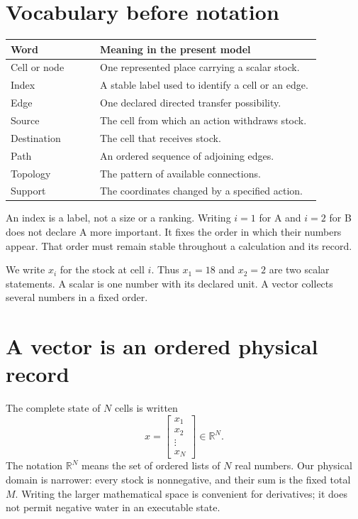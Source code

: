 \section{Vocabulary before notation}
\begin{center}
\begin{tabular}{P{0.25\linewidth}P{0.62\linewidth}}
\toprule
Word & Meaning in the present model\\
\midrule
Cell or node & One represented place carrying a scalar stock.\\
Index & A stable label used to identify a cell or an edge.\\
Edge & One declared directed transfer possibility.\\
Source & The cell from which an action withdraws stock.\\
Destination & The cell that receives stock.\\
Path & An ordered sequence of adjoining edges.\\
Topology & The pattern of available connections.\\
Support & The coordinates changed by a specified action.\\
\bottomrule
\end{tabular}
\end{center}
An index is a label, not a size or a ranking. Writing \(i=1\) for A and \(i=2\) for B does not declare A more important. It fixes the order in which their numbers appear. That order must remain stable throughout a calculation and its record.

We write \(x_i\) for the stock at cell \(i\). Thus \(x_1=18\) and \(x_2=2\) are two scalar statements. A scalar is one number with its declared unit. A vector collects several numbers in a fixed order.

\section{A vector is an ordered physical record}
The complete state of \(N\) cells is written
\begin{equation}
 x=\begin{bmatrix}x_1\\x_2\\\vdots\\x_N\end{bmatrix}\in\mathbb{R}^N.
\end{equation}
The notation \(\mathbb{R}^N\) means the set of ordered lists of \(N\) real numbers. Our physical domain is narrower: every stock is nonnegative, and their sum is the fixed total \(M\). Writing the larger mathematical space is convenient for derivatives; it does not permit negative water in an executable state.

